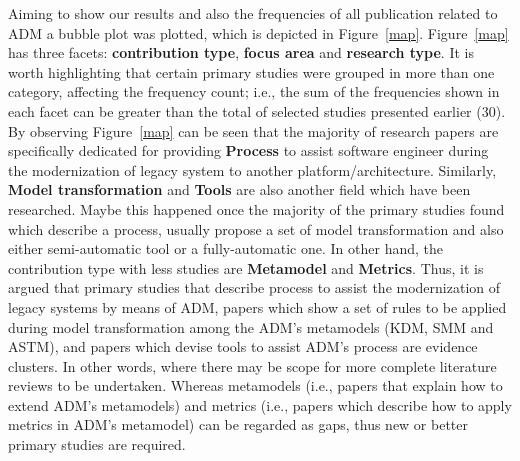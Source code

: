 Aiming to show our results and also the frequencies of all publication related to ADM a bubble plot was plotted, which is depicted in Figure~\ref{map}. 
%
%
Figure~\ref{map} has three facets: \textbf{contribution type}, \textbf{focus area} and \textbf{research type}. 
%
%
It is worth highlighting that certain primary studies were grouped in more than one category, affecting the frequency count; i.e., the sum of the frequencies shown in each facet can be greater than the total of selected studies presented earlier (30). By observing Figure~\ref{map} can be seen that the majority of research papers are specifically dedicated for providing \textbf{Process} to assist software engineer during the modernization of legacy system to another platform/architecture. Similarly, \textbf{Model transformation} and \textbf{Tools} are also another field which have been researched. Maybe this happened once the majority of the primary studies found which describe a process, usually propose a set of model transformation and also either semi-automatic tool or a fully-automatic one. In other hand, the contribution type with less studies are \textbf{Metamodel} and \textbf{Metrics}. Thus, it is argued that primary studies that describe process to assist the modernization of legacy systems by means of ADM, papers which show a set of rules to be applied during model transformation among the ADM's metamodels (KDM, SMM and ASTM), and papers which devise tools to assist ADM's process are evidence clusters. In other words, where there may be scope for more complete literature reviews to be undertaken. Whereas metamodels (i.e., papers that explain how to extend ADM's metamodels) and metrics (i.e., papers which describe how to apply metrics in ADM's metamodel) can be regarded as gaps, thus new or better primary studies are required. 



